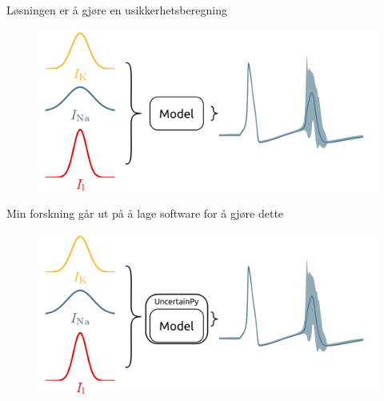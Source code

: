 \documentclass[presentation]{beamer}
\begin{document}
\begin{frame}{Løsningen er å gjøre en usikkerhetsberegning}
        \vspace{-1cm}
    \begin{figure}
       {\includegraphics[width=1.1\textwidth]{probabalistic_no_uncertainpy.png}}

    \end{figure}
\end{frame}



\begin{frame}{Min forskning går ut på å lage software for å gjøre dette}
    \vspace{-1cm}
    \begin{figure}
       {\includegraphics[width=1.1\textwidth]{probabalistic.png}}

    \end{figure}
\end{frame}

\end{document}

